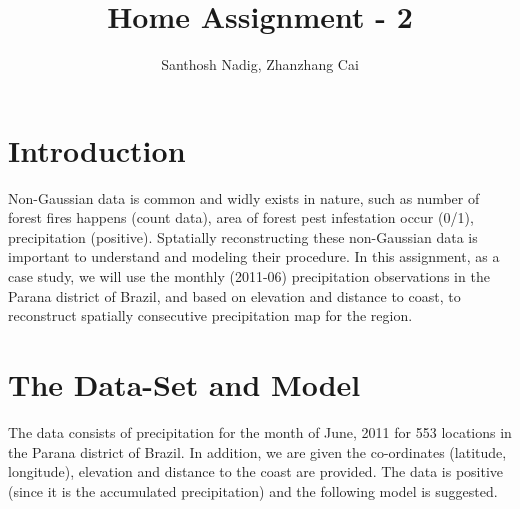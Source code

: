 \documentclass[a4paper,10pt]{article}
\title{Home Assignment - 2}
\author{Santhosh Nadig, Zhanzhang Cai}
\begin{document}
\maketitle

\section{Introduction}
Non-Gaussian data is common and widly exists in nature, such as number of forest fires happens (count data), area of forest pest infestation occur (0/1), precipitation (positive). Sptatially reconstructing these non-Gaussian data is important to understand and modeling their procedure. In this assignment, as a case study, we will use the monthly (2011-06) precipitation observations in the Parana district of Brazil, and based on elevation and distance to coast, to reconstruct spatially consecutive precipitation map for the region.  

\section{The Data-Set and Model}
\label{sec:model}
The data consists of precipitation for the month of June, 2011 for 553 locations in the Parana district of Brazil. In addition, we are given the co-ordinates (latitude, longitude), elevation and distance to the coast are provided. The data is positive (since it is the accumulated precipitation) and the following model is suggested.
\end{document}
